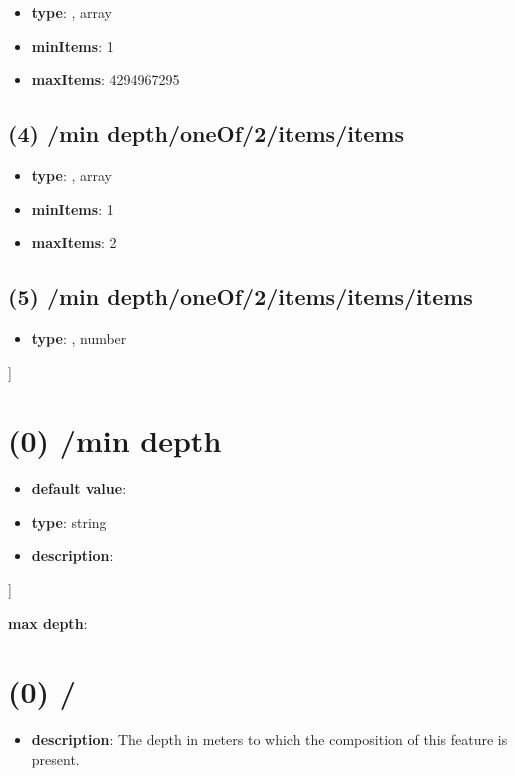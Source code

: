 \begin{itemize}[leftmargin=3em]\item {\bf type}: , array\item {\bf minItems}: 1
\item {\bf maxItems}: 4294967295
\end{itemize}\subsection{(4) /min depth/oneOf/2/items/items}
\begin{itemize}[leftmargin=4em]\item {\bf type}: , array\item {\bf minItems}: 1
\item {\bf maxItems}: 2
\end{itemize}\subsection{(5) /min depth/oneOf/2/items/items/items}
\begin{itemize}[leftmargin=5em]\item {\bf type}: , number\end{itemize}]\section{(0) /min depth}
\begin{itemize}[leftmargin=0em]\item {\bf default value}: 
\item {\bf type}: string
\item {\bf description}: 
\end{itemize}]\item {\bf max depth}: \section{(0) /}
\begin{itemize}[leftmargin=0em]\item {\bf description}: The depth in meters to which the composition of this feature is present.
\end{itemize}
